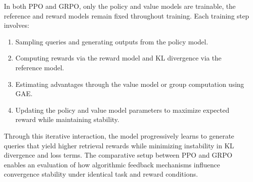 In both PPO and GRPO, only the policy and value models are trainable, the reference and reward models remain fixed throughout training. Each training step involves:
\begin{enumerate}
    \item Sampling queries and generating outputs from the policy model.
    \item Computing rewards via the reward model and KL divergence via the reference model.
    \item Estimating advantages through the value model or group computation using GAE.
    \item Updating the policy and value model parameters to maximize expected reward while maintaining stability.
\end{enumerate}
Through this iterative interaction, the model progressively learns to generate queries that yield higher retrieval rewards while minimizing instability in KL divergence and loss terms. The comparative setup between PPO and GRPO enables an evaluation of how algorithmic feedback mechanisms influence convergence stability under identical task and reward conditions.